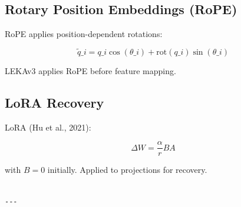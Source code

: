 \subsection{Rotary Position Embeddings (RoPE)}

RoPE applies position-dependent rotations:

\[
\tilde{q}\_i = q\_i \cos(\theta\_i) + \text{rot}(q\_i) \sin(\theta\_i)
\tag{3.11}
\]

LEKAv3 applies RoPE before feature mapping.

\subsection{LoRA Recovery}

LoRA (Hu et al., 2021):

\[
\Delta W = \frac{\alpha}{r} B A
\tag{3.12}
\]

with $B = 0$ initially. Applied to projections for recovery.
\begin{lstlisting}

---
\end{lstlisting}